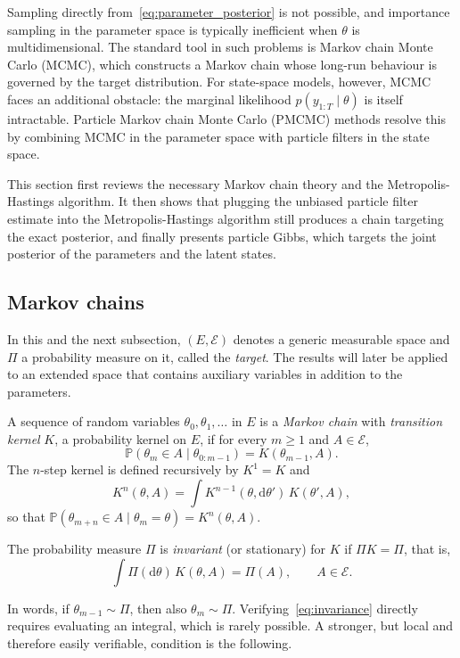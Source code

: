 Sampling directly from~\eqref{eq:parameter_posterior} is not possible, and importance sampling in the parameter space is typically inefficient when $\theta$ is multidimensional. The standard tool in such problems is Markov chain Monte Carlo (MCMC), which constructs a Markov chain whose long-run behaviour is governed by the target distribution. For state-space models, however, MCMC faces an additional obstacle: the marginal likelihood $p(y_{1:T}\mid\theta)$ is itself intractable. Particle Markov chain Monte Carlo (PMCMC) methods \cite{andrieu2010particle} resolve this by combining MCMC in the parameter space with particle filters in the state space.

This section first reviews the necessary Markov chain theory and the Metropolis-Hastings algorithm. It then shows that plugging the unbiased particle filter estimate into the Metropolis-Hastings algorithm still produces a chain targeting the exact posterior, and finally presents particle Gibbs, which targets the joint posterior of the parameters and the latent states.

\subsection{Markov chains}
\label{sec:markov_chains}
In this and the next subsection, $(E,\mathcal{E})$ denotes a generic measurable space and $\Pi$ a probability measure on it, called the \emph{target}. The results will later be applied to an extended space that contains auxiliary variables in addition to the parameters.

\begin{definition}
    \label{def:markov_chain}
    A sequence of random variables $\theta_0,\theta_1,\ldots$ in $E$ is a \emph{Markov chain} with \emph{transition kernel} $K$, a probability kernel on $E$, if for every $m\ge1$ and $A\in\mathcal{E}$,
    \begin{equation}
        \mathbb{P}\left(\theta_m\in A\mid\theta_{0:m-1}\right) = K(\theta_{m-1},A).
    \end{equation}
    The $n$-step kernel is defined recursively by $K^1 = K$ and
    \begin{equation}
        K^n(\theta,A) = \int K^{n-1}(\theta,\mathrm{d}\theta')\,K(\theta',A),
    \end{equation}
    so that $\mathbb{P}(\theta_{m+n}\in A\mid\theta_m = \theta) = K^n(\theta,A)$.
\end{definition}

\begin{definition}
    \label{def:invariance}
    The probability measure $\Pi$ is \emph{invariant} (or stationary) for $K$ if $\Pi K = \Pi$, that is,
    \begin{equation}
        \int\Pi(\mathrm{d}\theta)\,K(\theta,A) = \Pi(A), \qquad A\in\mathcal{E}.
        \label{eq:invariance}
    \end{equation}
\end{definition}
In words, if $\theta_{m-1}\sim\Pi$, then also $\theta_m\sim\Pi$. Verifying~\eqref{eq:invariance} directly requires evaluating an integral, which is rarely possible. A stronger, but local and therefore easily verifiable, condition is the following.

